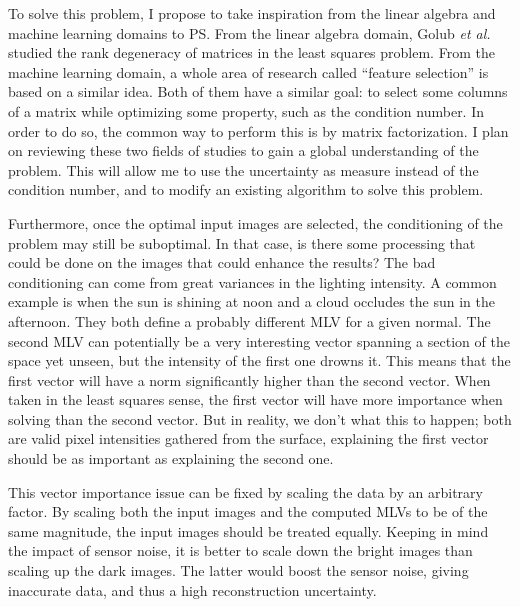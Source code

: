 To solve this problem, I propose to take inspiration from the linear algebra and machine learning domains to PS. From the linear algebra domain, Golub \emph{et al.}~\cite{Golub1977} studied the rank degeneracy of matrices in the least squares problem. From the machine learning domain, a whole area of research called ``feature selection'' is based on a similar idea. Both of them have a similar goal: to select some columns of a matrix while optimizing some property, such as the condition number. In order to do so, the common way to perform this is by matrix factorization. I plan on reviewing these two fields of studies to gain a global understanding of the problem. This will allow me to use the uncertainty as measure instead of the condition number, and to modify an existing algorithm to solve this problem.

Furthermore, once the optimal input images are selected, the conditioning of the problem may still be suboptimal. In that case, is there some processing that could be done on the images that could enhance the results? The bad conditioning can come from great variances in the lighting intensity. A common example is when the sun is shining at noon and a cloud occludes the sun in the afternoon. They both define a probably different MLV for a given normal. The second MLV can potentially be a very interesting vector spanning a section of the space yet unseen, but the intensity of the first one drowns it. This means that the first vector will have a norm significantly higher than the second vector. When taken in the least squares sense, the first vector will have more importance when solving than the second vector. But in reality, we don't what this to happen; both are valid pixel intensities gathered from the surface, explaining the first vector should be as important as explaining the second one.

This vector importance issue can be fixed by scaling the data by an arbitrary factor. By scaling both the input images and the computed MLVs to be of the same magnitude, the input images should be treated equally. Keeping in mind the impact of sensor noise, it is better to scale down the bright images than scaling up the dark images. The latter would boost the sensor noise, giving inaccurate data, and thus a high reconstruction uncertainty.




